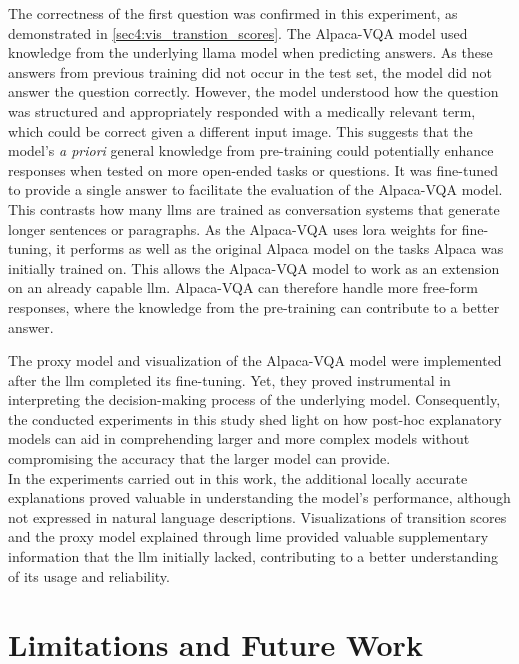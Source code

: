 The correctness of the first question was confirmed in this experiment, as demonstrated in \autoref{sec4:vis_transtion_scores}. The Alpaca-VQA model used knowledge from the underlying \gls{llama} model when predicting answers. As these answers from previous training did not occur in the test set, the model did not answer the question correctly. However, the model understood how the question was structured and appropriately responded with a medically relevant term, which could be correct given a different input image.
This suggests that the model's \textit{a priori} general knowledge from pre-training could potentially enhance responses when tested on more open-ended tasks or questions. It was fine-tuned to provide a single answer to facilitate the evaluation of the Alpaca-VQA model. This contrasts how many \glspl{llm} are trained as conversation systems that generate longer sentences or paragraphs. As the Alpaca-VQA uses \gls{lora} weights for fine-tuning, it performs as well as the original Alpaca model on the tasks Alpaca was initially trained on. This allows the Alpaca-VQA model to work as an extension on an already capable \gls{llm}. Alpaca-VQA can therefore handle more free-form responses, where the knowledge from the pre-training can contribute to a better answer.

The proxy model and visualization of the Alpaca-VQA model were implemented after the \gls{llm} completed its fine-tuning. Yet, they proved instrumental in interpreting the decision-making process of the underlying model. 
Consequently, the conducted experiments in this study shed light on how post-hoc explanatory models can aid in comprehending larger and more complex models without compromising the accuracy that the larger model can provide.\\


In the experiments carried out in this work, the additional locally accurate explanations proved valuable in understanding the model's performance, although not expressed in natural language descriptions. Visualizations of transition scores and the proxy model explained through \gls{lime} provided valuable supplementary information that the \gls{llm} initially lacked, contributing to a better understanding of its usage and reliability.



\section{Limitations and Future Work}
\label{sec:5_3_future_work}  %


